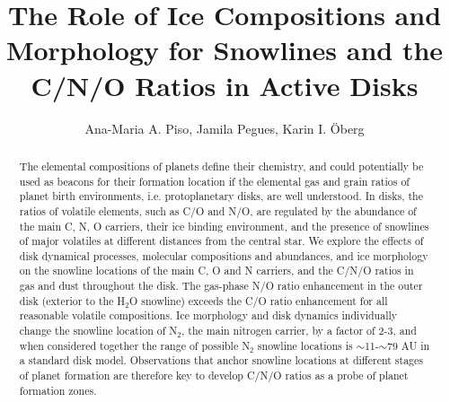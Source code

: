 \documentclass[apj]{emulateapj}
\begin{document}


\title{The Role of Ice Compositions and Morphology for Snowlines and the C/N/O Ratios in Active Disks}

\author{Ana-Maria A. Piso, Jamila Pegues, Karin I. \"Oberg}


\begin{abstract}
The elemental compositions of planets define their chemistry, and could potentially be used as beacons for their formation location if the elemental gas and grain ratios of planet birth environments, i.e. protoplanetary disks, are well understood. In disks, the ratios of volatile elements, such as C/O and N/O, are regulated by the abundance of the main C, N, O carriers, their ice binding environment, and the presence of snowlines of major volatiles at different distances from the central star. We explore the effects of disk dynamical processes, molecular compositions and abundances, and ice morphology on the snowline locations of the main C, O and N carriers, and the C/N/O ratios in gas and dust throughout the disk. The gas-phase N/O ratio enhancement in the outer disk (exterior to the H$_2$O snowline) exceeds the C/O ratio enhancement for all reasonable volatile compositions. Ice morphology and disk dynamics individually change the snowline location of N$_2$, the main nitrogen carrier, by a factor of 2-3, and when considered together the range of possible N$_2$ snowline locations is $\sim$11-$\sim$79 AU in a standard disk model. Observations that anchor snowline locations at different stages of planet formation are therefore key to develop C/N/O ratios as a probe of planet formation zones. 


\end{abstract}
\end{document}
